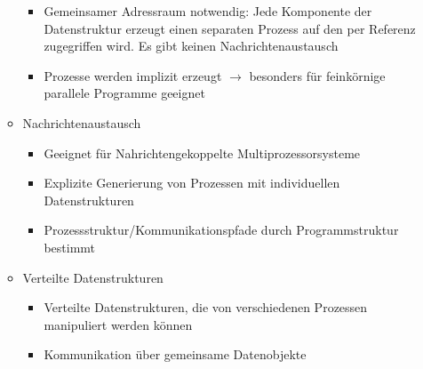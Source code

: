 \begin{itemize}
\begin{itemize}
		\begin{itemize}
			\item Gemeinsamer Adressraum notwendig: Jede Komponente der Datenstruktur erzeugt einen separaten Prozess auf den per Referenz zugegriffen wird. Es gibt keinen Nachrichtenaustausch
			\item Prozesse werden implizit erzeugt \(\rightarrow\) besonders für feinkörnige parallele Programme geeignet
		\end{itemize}
		\item Nachrichtenaustausch
		\begin{itemize}
			\item Geeignet für Nahrichtengekoppelte Multiprozessorsysteme
			\item Explizite Generierung von Prozessen mit individuellen Datenstrukturen
			\item Prozessstruktur/Kommunikationspfade durch Programmstruktur bestimmt
		\end{itemize}
		\item Verteilte Datenstrukturen
		\begin{itemize}
			\item Verteilte Datenstrukturen, die von verschiedenen Prozessen manipuliert werden können
			\item Kommunikation über gemeinsame Datenobjekte
		\end{itemize}
	\end{itemize}
\end{itemize}


